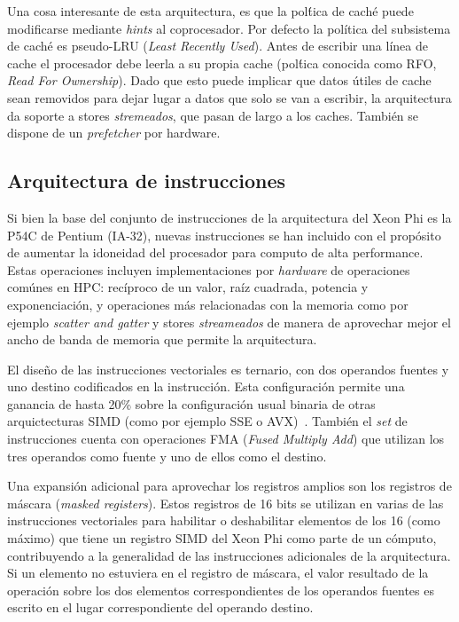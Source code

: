 Una cosa interesante de esta arquitectura, es que la pol\'tica de cach\'e puede modificarse mediante \textit{hints} al coprocesador. Por defecto la pol\'itica del subsistema
de cach\'e es pseudo-LRU (\textit{Least Recently Used}). Antes de escribir una l\'inea de cache el procesador debe leerla a su propia
cache (pol\'tica conocida como RFO, \textit{Read For Ownership}). Dado que esto puede implicar que datos \'utiles de cache
sean removidos para dejar lugar a datos que solo se van a escribir, la arquitectura da soporte a stores \textit{stremeados},
que pasan de largo a los caches. Tambi\'en se dispone de un \textit{prefetcher} por hardware.

\subsection{Arquitectura de instrucciones}

Si bien la base del conjunto de instrucciones de la arquitectura del Xeon Phi es la P54C de Pentium (IA-32), nuevas instrucciones
se han incluido con el prop\'osito de aumentar la idoneidad del procesador para computo de alta performance.
Estas operaciones incluyen implementaciones por \textit{hardware} de operaciones com\'unes en HPC: rec\'iproco de un valor,
ra\'iz cuadrada, potencia y exponenciaci\'on, y operaciones m\'as relacionadas con la memoria como por ejemplo \textit{scatter and gatter}
y stores \textit{streameados} de manera de aprovechar mejor el ancho de banda de memoria que permite la arquitectura.

El dise\~no de las instrucciones vectoriales es ternario, con dos operandos fuentes y uno destino codificados en la instrucci\'on.
Esta configuraci\'on permite una ganancia de hasta 20\% sobre la configuraci\'on usual binaria de otras arquictecturas SIMD (como
por ejemplo SSE o AVX)~\cite{BookXeonPhi}. Tambi\'en el \textit{set} de instrucciones cuenta con operaciones FMA (\textit{Fused
Multiply Add}) que utilizan los tres operandos como fuente y uno de ellos como el destino.

Una expansi\'on adicional para aprovechar los registros amplios son los registros de m\'ascara (\textit{masked registers}).
Estos registros de 16 bits se utilizan en varias de las instrucciones vectoriales para habilitar o deshabilitar elementos
de los 16 (como m\'aximo) que tiene un registro SIMD del Xeon Phi como parte de un c\'omputo, contribuyendo a la generalidad de
las instrucciones adicionales de la arquitectura. Si un elemento no estuviera en el registro de m\'ascara, el valor resultado de la operaci\'on
sobre los dos elementos correspondientes de los operandos fuentes es escrito en el lugar correspondiente del operando destino.

